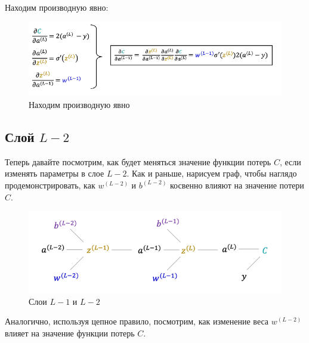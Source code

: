 \documentclass[a4paper, 10pt, openany]{book} %
\begin{document}
	Находим производную явно:
	
	\begin{figure}[h!]
		\centering
		\includegraphics[width=\linewidth]{pictures/backpropagation/last_activation_itself.png}
		\caption{Находим производную явно}
		\label{last_activation_itself}
	\end{figure}
	
	\subsection{Слой $L-2$}
	
	Теперь давайте посмотрим, как будет меняться значение функции потерь $C$, если изменять параметры в слое $L-2$. Как и раньше, нарисуем граф, чтобы наглядо продемонстрировать, как $w^{(L-2)}$ и $b^{(L-2)}$ косвенно влияют на значение потери $C$.
	
	\begin{figure}[h!]
		\centering
		\includegraphics[width=\linewidth]{pictures/backpropagation/first_layer.png}
		\caption{Слои $L-1$ и $L-2$}
		\label{first_layer}
	\end{figure}
	
	Аналогично, используя цепное правило, посмотрим, как изменение веса $w^{(L-2)}$ влияет на значение функции потерь $C$.
	
\end{document}
